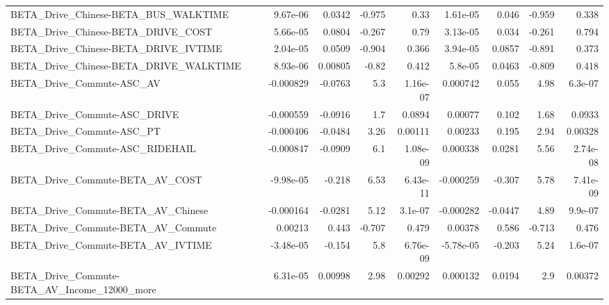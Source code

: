 \begin{tabular}{lrrrrrrrr}
BETA\_Drive\_Chinese-BETA\_BUS\_WALKTIME               &    9.67e-06 &       0.0342 &    -0.975 &     0.33 &   1.61e-05 &       0.046 &       -0.959 &         0.338 \\
BETA\_Drive\_Chinese-BETA\_DRIVE\_COST                 &    5.66e-05 &       0.0804 &    -0.267 &     0.79 &   3.13e-05 &       0.034 &       -0.261 &         0.794 \\
BETA\_Drive\_Chinese-BETA\_DRIVE\_IVTIME               &    2.04e-05 &       0.0509 &    -0.904 &    0.366 &   3.94e-05 &      0.0857 &       -0.891 &         0.373 \\
BETA\_Drive\_Chinese-BETA\_DRIVE\_WALKTIME             &    8.93e-06 &      0.00805 &     -0.82 &    0.412 &    5.8e-05 &      0.0463 &       -0.809 &         0.418 \\
BETA\_Drive\_Commute-ASC\_AV                          &   -0.000829 &      -0.0763 &       5.3 & 1.16e-07 &   0.000742 &       0.055 &         4.98 &       6.3e-07 \\
BETA\_Drive\_Commute-ASC\_DRIVE                       &   -0.000559 &      -0.0916 &       1.7 &   0.0894 &    0.00077 &       0.102 &         1.68 &        0.0933 \\
BETA\_Drive\_Commute-ASC\_PT                          &   -0.000406 &      -0.0484 &      3.26 &  0.00111 &    0.00233 &       0.195 &         2.94 &       0.00328 \\
BETA\_Drive\_Commute-ASC\_RIDEHAIL                    &   -0.000847 &      -0.0909 &       6.1 & 1.08e-09 &   0.000338 &      0.0281 &         5.56 &      2.74e-08 \\
BETA\_Drive\_Commute-BETA\_AV\_COST                    &   -9.98e-05 &       -0.218 &      6.53 & 6.43e-11 &  -0.000259 &      -0.307 &         5.78 &      7.41e-09 \\
BETA\_Drive\_Commute-BETA\_AV\_Chinese                 &   -0.000164 &      -0.0281 &      5.12 &  3.1e-07 &  -0.000282 &     -0.0447 &         4.89 &       9.9e-07 \\
BETA\_Drive\_Commute-BETA\_AV\_Commute                 &     0.00213 &        0.443 &    -0.707 &    0.479 &    0.00378 &       0.586 &       -0.713 &         0.476 \\
BETA\_Drive\_Commute-BETA\_AV\_IVTIME                  &   -3.48e-05 &       -0.154 &       5.8 & 6.76e-09 &  -5.78e-05 &      -0.203 &         5.24 &       1.6e-07 \\
BETA\_Drive\_Commute-BETA\_AV\_Income\_12000\_more       &    6.31e-05 &      0.00998 &      2.98 &  0.00292 &   0.000132 &      0.0194 &          2.9 &       0.00372 \\

\end{tabular}
